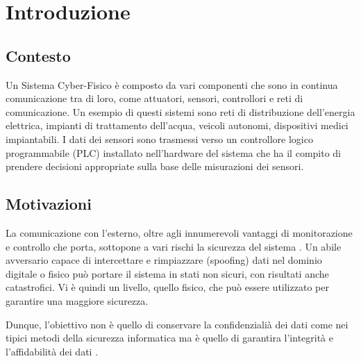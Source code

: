 \documentclass[Lau,binding=0.6cm,noexaminfo]{sapthesis}
\begin{document}

\mainmatter

\chapter{Introduzione}

\section{Contesto}
Un Sistema Cyber-Fisico \`e composto da vari componenti che sono in continua comunicazione tra di loro, come attuatori, sensori, controllori e reti di comunicazione. 
Un esempio di questi sistemi sono reti di distribuzione dell'energia elettrica, impianti di trattamento dell'acqua, veicoli autonomi, dispositivi medici impiantabili.
I dati dei sensori sono trasmessi verso un controllore logico programmabile (PLC) installato nell'hardware del sistema che ha il compito di prendere decisioni appropriate sulla base delle misurazioni dei sensori.

\section{Motivazioni}
La comunicazione con l'esterno, oltre agli innumerevoli vantaggi di monitorazione e controllo che porta, sottopone a vari rischi la sicurezza del sistema \cite{cardenas2009challenges}. 
Un abile avversario capace di intercettare e rimpiazzare (spoofing) dati nel dominio digitale o fisico pu\`o portare il sistema in stati non sicuri, con risultati anche catastrofici.
Vi \`e quindi un livello, quello fisico, che pu\`o essere utilizzato per garantire una maggiore sicurezza.

Dunque, l'obiettivo non \`e quello di conservare la confidenziali\`a dei dati come nei tipici metodi della sicurezza informatica ma \`e quello di garantira l'integrit\`a e l'affidabilit\`a dei dati \cite{gollmann2016cyber}. 
\end{document}
